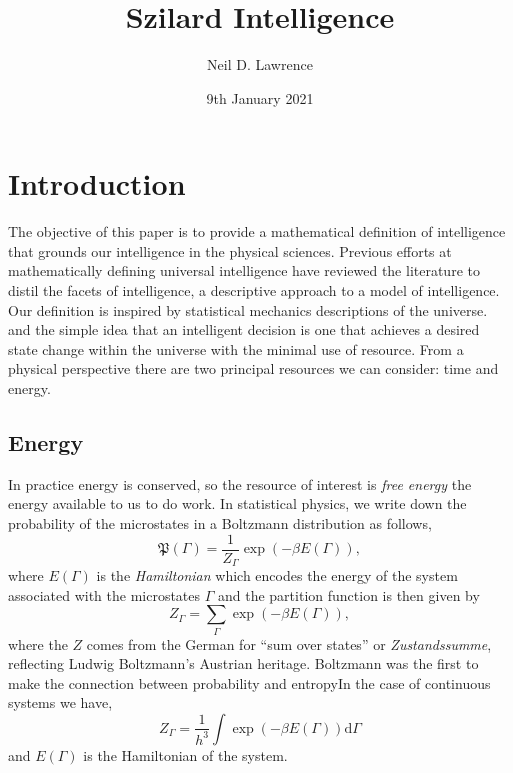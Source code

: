 \documentclass[]{article}
\title{Szilard Intelligence}
\author{Neil D. Lawrence}
\date{9th January 2021}
\begin{document}
\maketitle


\newcommand{\phaseVariables}{\Gamma}
\newcommand{\stateVariables}{X}
\newcommand{\nullVariables}{{X_0}}
\newcommand{\domainVariables}{{X_1}}
\newcommand{\dataVariables}{Y}
\newcommand{\measuredVariables}{S}
\newcommand{\measuredValue}{s}
\newcommand{\parameterVector}{W}
\newcommand{\separability}{{F_S}}
\newcommand{\expDist}[2]{\left\langle #1 \right\rangle_{#2}}
\newcommand{\trueProb}{\mathfrak{P}}
\newcommand{\simProb}{s}
\newcommand{\domainProb}{\mathbb{P}}
\newcommand{\physicsProb}{p}
\newcommand{\approxProb}{q}
\newcommand{\statsProb}{\pi}




\section{Introduction}

The objective of this paper is to provide a mathematical definition of intelligence that grounds our intelligence in the physical sciences. Previous efforts at mathematically defining universal intelligence \citep{Legg-universal07} have reviewed the literature to distil the facets of intelligence, a descriptive approach to a model of intelligence. Our definition is inspired by statistical mechanics descriptions of the universe.  and the simple idea that an intelligent decision is one that achieves a desired state change within the universe with the minimal use of resource. From a physical perspective there are two principal resources we can consider: time and energy. 
\subsection{Energy}

In practice energy is conserved, so the resource of interest is \emph{free energy} the energy available to us to do work.  In statistical physics, we write down the probability of the microstates in a Boltzmann distribution as follows,
\[
\trueProb(\phaseVariables) = \frac{1}{Z_\phaseVariables} \exp(-\beta
E(\phaseVariables)),
\] 
where \(E(\phaseVariables)\) is the \emph{Hamiltonian} which encodes the energy of the system associated with the microstates \(\phaseVariables\) and the partition function is then given by 
\[
Z_\phaseVariables = \sum_\phaseVariables \exp(-\beta E(\phaseVariables)),
\] 
where the \(Z\) comes from the German for ``sum over states'' or
\emph{Zustandssumme}, reflecting Ludwig Boltzmann's Austrian heritage. Boltzmann was the first to make the connection between probability and entropy\citep{Boltzmann-warmetheorie77,}In the
case of continuous systems we have,
\[
Z_{\phaseVariables} = \frac{1}{h^3}\int \exp(-\beta E(\phaseVariables)) \text{d} \phaseVariables
\] 
and \(E(\phaseVariables)\) is the Hamiltonian of the system.
\end{document}

